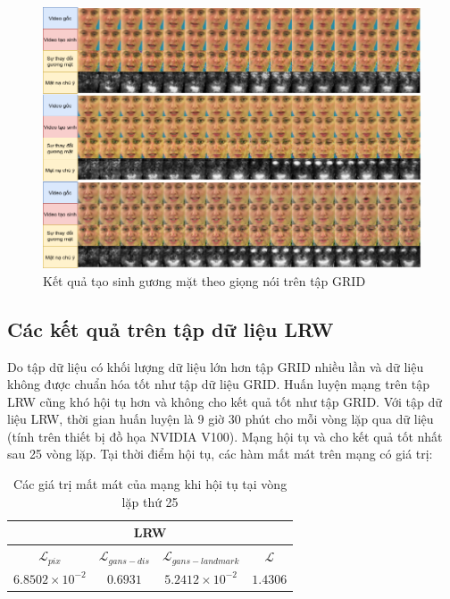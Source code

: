 \begin{figure}[H]
    \centering
    \includegraphics[width=15cm]{./content/materials/grid_examples-face.png}
    \caption{Kết quả tạo sinh gương mặt theo giọng nói trên tập GRID}
\end{figure}

\subsection{Các kết quả trên tập dữ liệu LRW}

Do tập dữ liệu có khối lượng dữ liệu lớn hơn tập GRID nhiều lần và dữ liệu không được chuẩn hóa tốt như tập dữ liệu GRID. Huấn luyện mạng trên tập LRW cũng khó hội tụ hơn và không cho kết quả tốt như tập GRID. Với tập dữ liệu LRW, thời gian huấn luyện là 9 giờ 30 phút cho mỗi vòng lặp qua dữ liệu (tính trên thiết bị đồ họa NVIDIA V100). Mạng hội tụ và cho kết quả tốt nhất sau 25 vòng lặp. Tại thời điểm hội tụ, các hàm mất mát trên mạng có giá trị:

\begin{table}[h]
    \centering
    \begin{tabular}{c | c | c | c}
    \hline 
    \multicolumn{4}{c}{LRW}\\
    \hline 
    \textbf{$\mathcal{L}_{pix}$} & \textbf{$\mathcal{L}_{gans-dis}$} & \textbf{$\mathcal{L}_{gans-landmark}$} & \textbf{$\mathcal{L}$}\\
    \hline
    $6.8502 \times 10^{-2}$ & $0.6931$ & $5.2412 \times 10^{-2}$ & $1.4306$\\
    \end{tabular}
    \caption{Các giá trị mất mát của mạng khi hội tụ tại vòng lặp thứ 25}
    \label{table:lrw_loss}
\end{table}

